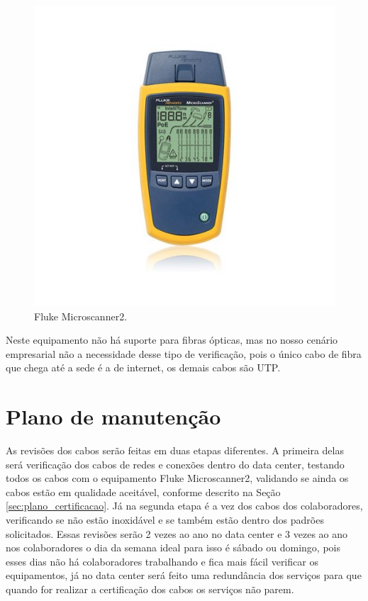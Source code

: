 \documentclass[	DIV=calc,%
							paper=a4,%
							fontsize=12pt,%
							onecolumn]{scrartcl}	 					%
\begin{document}
\begin{figure}[!htbp]
	\centering
	\includegraphics[width=\textwidth]{./imagens/fluke-microscanner2.png}
	\caption{Fluke Microscanner2.}
	\label{fig:fluke-microscanner2}
\end{figure} 

Neste equipamento não há suporte para fibras ópticas, mas no nosso cenário empresarial não a necessidade desse tipo de verificação, pois o único cabo de fibra que chega até a sede é a de internet, os demais cabos são UTP.  

\section{Plano de manutenção}
As revisões dos cabos serão feitas em duas etapas diferentes. A primeira delas será verificação dos cabos de redes e conexões dentro do data center, testando todos os cabos com o equipamento Fluke Microscanner2, validando se ainda os cabos estão em qualidade aceitável, conforme descrito na Seção \ref{sec:plano_certificacao}. Já na segunda etapa é a vez dos cabos dos colaboradores, verificando se não estão inoxidável e se também estão dentro dos padrões solicitados. Essas revisões serão 2 vezes ao ano no data center e 3 vezes ao ano nos colaboradores o dia da semana ideal para isso é sábado ou domingo, pois esses dias não há colaboradores trabalhando e fica mais fácil verificar os equipamentos, já no data center será feito uma redundância dos serviços para que quando for realizar a certificação dos cabos os serviços não parem.
\end{document}
